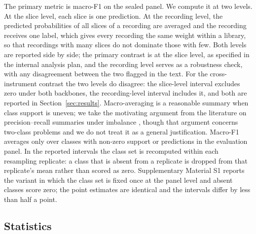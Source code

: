 The primary metric is macro-F1 on the sealed panel. We compute it at two levels. At the slice
level, each slice is one prediction. At the recording level, the predicted probabilities of all
slices of a recording are averaged and the recording receives one label, which gives every
recording the same weight within a library, so that recordings with many slices do not dominate
those with few. Both levels are reported side by side; the
primary contrast is at the slice level, as specified in the internal analysis plan, and the recording level
serves as a robustness check, with any disagreement between the two flagged in the text. For the
cross-instrument contrast the two levels do disagree: the slice-level interval excludes zero under
both backbones, the recording-level interval includes it, and both are reported in
Section~\ref{sec:results}. Macro-averaging is a reasonable summary when class support is uneven; we take the
motivating argument from the literature on precision--recall summaries under imbalance \citep{saito2015pr}, though that argument concerns two-class problems and we do not treat it as a general justification. Macro-F1 averages only over classes with non-zero support or
predictions in the evaluation panel. In the reported intervals the class set is recomputed within
each resampling replicate: a class that is absent from a replicate is dropped from that
replicate's mean rather than scored as zero. Supplementary Material S1 reports the variant in
which the class set is fixed once at the panel level and absent classes score zero; the point
estimates are identical and the intervals differ by less than half a point.

\subsection{Statistics}


